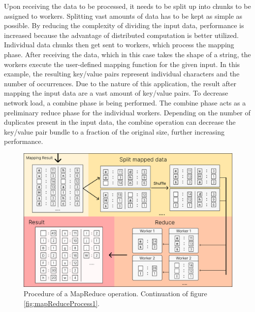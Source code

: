 \documentclass[12pt, letterpaper]{article}
\begin{document}
Upon receiving the data to be processed, it needs to be split up into chunks to be assigned to workers. Splitting vast amounts of data has to be kept as simple as possible. By reducing the complexity of dividing the input data, performance is increased because the advantage of distributed computation is better utilized.\newline
Individual data chunks then get sent to workers, which process the mapping phase. After receiving the data, which in this case takes the shape of a string, the workers execute the user-defined mapping function for the given input. In this example, the resulting key/value pairs represent individual characters and the number of occurrences.\newline
Due to the nature of this application, the result after mapping the input data are a vast amount of key/value pairs. To decrease network load, a combine phase is being performed. The combine phase acts as a preliminary reduce phase for the individual workers. Depending on the number of duplicates present in the input data, the combine operation can decrease the key/value pair bundle to a fraction of the original size, further increasing performance. 

\begin{figure}[h]
	\centering
	\includegraphics[width=0.9\linewidth]{img/MapReduceAblaufPart2}
	\caption{Procedure of a MapReduce operation. Continuation of figure \ref{fig:mapReduceProcess1}.}
	\label{fig:mapReduceProcess2}
\end{figure}
\end{document}
